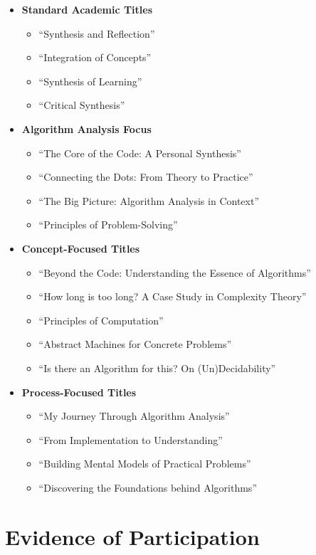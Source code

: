 \documentclass{article}
\theoremstyle{theorem}
\theoremstyle{definition}
\theoremstyle{remark}
\begin{document}
\begin{itemize}
\item \textbf{Standard Academic Titles}
  \begin{itemize}
  \item ``Synthesis and Reflection''
  \item ``Integration of Concepts''
  \item ``Synthesis of Learning''
  \item ``Critical Synthesis''
  \end{itemize}

\item \textbf{Algorithm Analysis Focus}
  \begin{itemize}
  \item ``The Core of the Code: A Personal Synthesis''
  \item ``Connecting the Dots: From Theory to Practice''
  \item ``The Big Picture: Algorithm Analysis in Context''
  \item ``Principles of Problem-Solving''
  \end{itemize}

\item \textbf{Concept-Focused Titles}
  \begin{itemize}
  \item ``Beyond the Code: Understanding the Essence of Algorithms''
  \item ``How long is too long? A Case Study in Complexity Theory''
  \item ``Principles of Computation''
  \item ``Abstract Machines for Concrete Problems''
  \item ``Is there an Algorithm for this? On (Un)Decidability''
  \end{itemize}

\item \textbf{Process-Focused Titles}
  \begin{itemize}
  \item ``My Journey Through Algorithm Analysis''
  \item ``From Implementation to Understanding''
  \item ``Building Mental Models of Practical Problems''
  \item ``Discovering the Foundations behind Algorithms''
  \end{itemize}
\end{itemize}


\section{Evidence of Participation}
\end{document}
